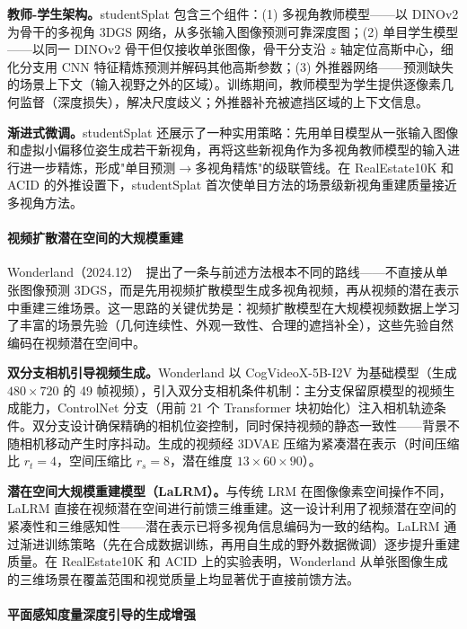 \textbf{教师-学生架构。}studentSplat 包含三个组件：(1) 多视角教师模型——以 DINOv2 为骨干的多视角 3DGS 网络，从多张输入图像预测可靠深度图；(2) 单目学生模型——以同一 DINOv2 骨干但仅接收单张图像，骨干分支沿 $z$ 轴定位高斯中心，细化分支用 CNN 特征精炼预测并解码其他高斯参数；(3) 外推器网络——预测缺失的场景上下文（输入视野之外的区域）。训练期间，教师模型为学生提供逐像素几何监督（深度损失），解决尺度歧义；外推器补充被遮挡区域的上下文信息。

\textbf{渐进式微调。}studentSplat 还展示了一种实用策略：先用单目模型从一张输入图像和虚拟小偏移位姿生成若干新视角，再将这些新视角作为多视角教师模型的输入进行进一步精炼，形成"单目预测$\to$多视角精炼"的级联管线。在 RealEstate10K 和 ACID 的外推设置下，studentSplat 首次使单目方法的场景级新视角重建质量接近多视角方法。

\paragraph{视频扩散潜在空间的大规模重建}

Wonderland（2024.12）~\cite{2412_12091}提出了一条与前述方法根本不同的路线——不直接从单张图像预测 3DGS，而是先用视频扩散模型生成多视角视频，再从视频的潜在表示中重建三维场景。这一思路的关键优势是：视频扩散模型在大规模视频数据上学习了丰富的场景先验（几何连续性、外观一致性、合理的遮挡补全），这些先验自然编码在视频潜在空间中。

\textbf{双分支相机引导视频生成。}Wonderland 以 CogVideoX-5B-I2V 为基础模型（生成 $480 \times 720$ 的 49 帧视频），引入双分支相机条件机制：主分支保留原模型的视频生成能力，ControlNet 分支（用前 21 个 Transformer 块初始化）注入相机轨迹条件。双分支设计确保精确的相机位姿控制，同时保持视频的静态一致性——背景不随相机移动产生时序抖动。生成的视频经 3DVAE 压缩为紧凑潜在表示（时间压缩比 $r_t{=}4$，空间压缩比 $r_s{=}8$，潜在维度 $13 \times 60 \times 90$）。

\textbf{潜在空间大规模重建模型（LaLRM）。}与传统 LRM 在图像像素空间操作不同，LaLRM 直接在视频潜在空间进行前馈三维重建。这一设计利用了视频潜在空间的紧凑性和三维感知性——潜在表示已将多视角信息编码为一致的结构。LaLRM 通过渐进训练策略（先在合成数据训练，再用自生成的野外数据微调）逐步提升重建质量。在 RealEstate10K 和 ACID 上的实验表明，Wonderland 从单张图像生成的三维场景在覆盖范围和视觉质量上均显著优于直接前馈方法。

\paragraph{平面感知度量深度引导的生成增强}

